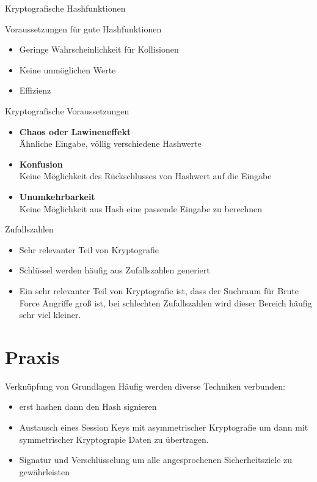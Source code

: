 \documentclass[10pt]{beamer}
\begin{document}
	\begin{frame}{Kryptografische Hashfunktionen}
		\begin{alertblock}{Voraussetzungen für gute Hashfunktionen}
			\begin{itemize}
				\item Geringe Wahrscheinlichkeit für Kollisionen
				\item Keine unmöglichen Werte
				\item Effizienz
			\end{itemize}
		\end{alertblock}
		\begin{alertblock}{Kryptografische Voraussetzungen}
			\begin{itemize}
				\item \textbf{Chaos oder Lawineneffekt}\\
				Ähnliche Eingabe, völlig verschiedene Hashwerte
				\item \textbf{Konfusion}\\
				Keine Möglichkeit des Rückschlusses von Hashwert auf die Eingabe
				\item \textbf{Unumkehrbarkeit}\\
				Keine Möglichkeit aus Hash eine passende Eingabe zu berechnen
			\end{itemize}
			
		\end{alertblock}
	\end{frame}

	\begin{frame}{Zufallszahlen}
		\begin{itemize}
			\item Sehr relevanter Teil von Kryptografie
			\item Schlüssel werden häufig aus Zufallszahlen generiert
			\item Ein sehr relevanter Teil von Kryptografie ist, dass der Suchraum für Brute Force Angriffe groß ist, bei schlechten Zufallszahlen wird dieser Bereich häufig sehr viel kleiner.
		\end{itemize}
	\end{frame}
	
	\section{Praxis}
	
	\begin{frame}{Verknüpfung von Grundlagen}
		Häufig werden diverse Techniken verbunden:
		\begin{itemize}
			\item erst hashen dann den Hash signieren
			\item Austausch eines Session Keys mit asymmetrischer Kryptografie um dann mit symmetrischer Kryptograpie Daten zu übertragen.
			\item Signatur und Verschlüsselung um alle angesprochenen Sicherheitsziele zu gewährleisten
		\end{itemize}
	\end{frame}
\end{document}
